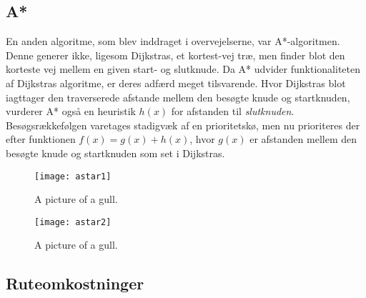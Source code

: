 \subsection{A*}
\label{subsec:astar}
En anden algoritme, som blev inddraget i overvejelserne, var A*-algoritmen. Denne generer ikke, ligesom Dijkstras, et kortest-vej træ, men finder blot den korteste vej mellem en given start- og slutknude. Da A* udvider funktionaliteten af Dijkstras algoritme, er deres adfærd meget tilsvarende. Hvor Dijkstras blot iagttager den traverserede afstande mellem den besøgte knude og startknuden, vurderer A* også en heuristik $h(x)$ for afstanden til \emph{slutknuden}. Besøgsrækkefølgen varetages stadigvæk af en prioritetskø, men nu prioriteres der efter funktionen $f(x)=g(x)+h(x)$, hvor $g(x)$ er afstanden mellem den besøgte knude og startknuden som set i Dijkstras.

\begin{figure}[h]
	\centering
  \texttt{[image: astar1]}
  \captionsetup{width=0.8\textwidth}
	\caption{A picture of a gull.}
\end{figure}

\begin{figure}[h]
	\centering
  \texttt{[image: astar2]}
  \captionsetup{width=0.8\textwidth}
	\caption{A picture of a gull.}
\end{figure}

\subsection{Ruteomkostninger}
\label{subsec:ruteomkostninger}
